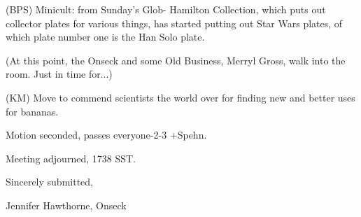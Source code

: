 \documentclass[12pt]{article}
\begin{document}
(BPS) Minicult: from Sunday's Glob- Hamilton Collection, which puts out collector plates for various things, has started putting out Star Wars plates, of which plate number one is the Han Solo plate.

(At this point, the Onseck and some Old Business, Merryl Gross, walk into the room. Just in time for...)

(KM) Move to commend scientists the world over for finding new and better uses for bananas.

Motion seconded, passes everyone-2-3 +Spehn.

\vspace{12pt}

\noindent
Meeting adjourned, 1738 SST.

\vspace{18pt}

\centerline{Sincerely submitted,}
\centerline{Jennifer Hawthorne, Onseck}
\end{document}
